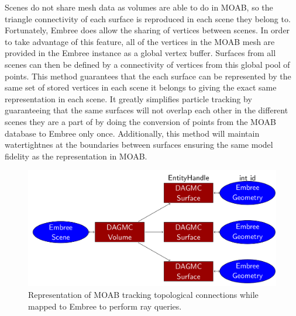 \documentclass[12pt, a4paper]{article}
\begin{document}
Scenes do not share mesh data as volumes are able to do in MOAB, so the triangle connectivity of each surface is reproduced in each scene they belong to. Fortunately, Embree does allow the sharing of vertices between scenes. In order to take advantage of this feature, all of the vertices in the MOAB mesh are provided in the Embree instance as a global vertex buffer. Surfaces from all scenes can then be defined by a connectivity of vertices from this global pool of points. This method guarantees that the each surface can be represented by the same set of stored vertices in each scene it belongs to giving the exact same representation in each scene. It greatly simplifies particle tracking by guaranteeing that the same surfaces will not overlap each other in the different scenes they are a part of by doing the conversion of points from the MOAB database to Embree only once. Additionally, this method will maintain watertightnes at the boundaries between surfaces ensuring the same model fidelity as the representation in MOAB.

\begin{figure}
  \centering
  \includegraphics[scale=0.3]{emdag_mapping.png}
  \caption{Representation of MOAB tracking topological connections while mapped to Embree to perform ray queries.}
  \label{emdag_mapping}
\end{figure}
\end{document}
